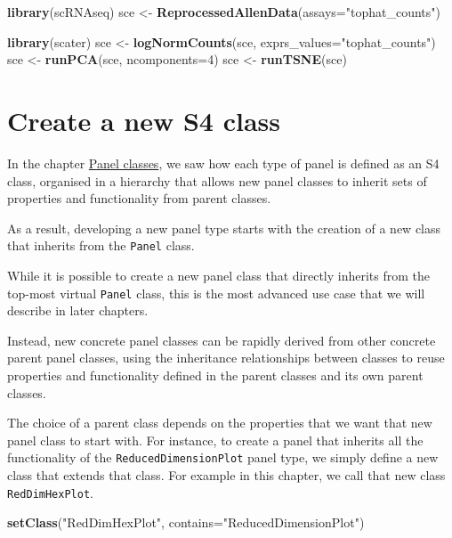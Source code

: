 \documentclass[
]{book}
\newenvironment{Shaded}{\begin{snugshade}}{\end{snugshade}}
\newcommand{\DataTypeTok}[1]{\textcolor[rgb]{0.13,0.29,0.53}{#1}}
\newcommand{\DecValTok}[1]{\textcolor[rgb]{0.00,0.00,0.81}{#1}}
\newcommand{\KeywordTok}[1]{\textcolor[rgb]{0.13,0.29,0.53}{\textbf{#1}}}
\newcommand{\NormalTok}[1]{#1}
\newcommand{\StringTok}[1]{\textcolor[rgb]{0.31,0.60,0.02}{#1}}
\begin{document}
\begin{Shaded}
\begin{Highlighting}[]
\KeywordTok{library}\NormalTok{(scRNAseq)}
\NormalTok{sce <-}\StringTok{ }\KeywordTok{ReprocessedAllenData}\NormalTok{(}\DataTypeTok{assays=}\StringTok{"tophat_counts"}\NormalTok{)}

\KeywordTok{library}\NormalTok{(scater)}
\NormalTok{sce <-}\StringTok{ }\KeywordTok{logNormCounts}\NormalTok{(sce, }\DataTypeTok{exprs_values=}\StringTok{"tophat_counts"}\NormalTok{)}
\NormalTok{sce <-}\StringTok{ }\KeywordTok{runPCA}\NormalTok{(sce, }\DataTypeTok{ncomponents=}\DecValTok{4}\NormalTok{)}
\NormalTok{sce <-}\StringTok{ }\KeywordTok{runTSNE}\NormalTok{(sce)}
\end{Highlighting}
\end{Shaded}

\hypertarget{create-a-new-s4-class}{%
\section{Create a new S4 class}\label{create-a-new-s4-class}}

In the chapter \protect\hyperlink{panels}{Panel classes}, we saw how each type of panel is defined as an S4 class, organised in a hierarchy that allows new panel classes to inherit sets of properties and functionality from parent classes.

As a result, developing a new panel type starts with the creation of a new class that inherits from the \texttt{Panel} class.

While it is possible to create a new panel class that directly inherits from the top-most virtual \texttt{Panel} class, this is the most advanced use case that we will describe in later chapters.

Instead, new concrete panel classes can be rapidly derived from other concrete parent panel classes, using the inheritance relationships between classes to reuse properties and functionality defined in the parent classes and its own parent classes.

The choice of a parent class depends on the properties that we want that new panel class to start with.
For instance, to create a panel that inherits all the functionality of the \texttt{ReducedDimensionPlot} panel type, we simply define a new class that extends that class.
For example in this chapter, we call that new class \texttt{RedDimHexPlot}.

\begin{Shaded}
\begin{Highlighting}[]
\KeywordTok{setClass}\NormalTok{(}\StringTok{"RedDimHexPlot"}\NormalTok{, }\DataTypeTok{contains=}\StringTok{"ReducedDimensionPlot"}\NormalTok{)}
\end{Highlighting}
\end{Shaded}
\end{document}
